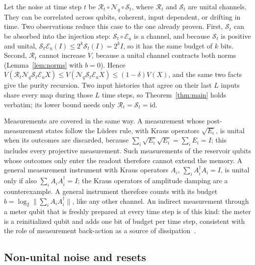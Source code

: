 \documentclass[aps,prl,twocolumn,superscriptaddress,floatfix]{revtex4-2}
\theoremstyle{plain}
\newcommand{\Norm}[1]{\lVert #1\rVert}
\newcommand{\cE}{\mathcal E}
\newcommand{\Nq}{\mathcal N_q}
\begin{document}
Let the noise at time step $t$ be $\mathcal R_t\circ\Nq\circ\mathcal S_t$, where $\mathcal R_t$ and $\mathcal S_t$ are unital channels. They can be correlated across qubits, coherent, input dependent, or drifting in time. Two observations reduce this case to the one already proven. First, $\mathcal S_t$ can be absorbed into the injection step: $\mathcal S_t\circ\cE_u$ is a channel, and because $\mathcal S_t$ is positive and unital, $\mathcal S_t\cE_u(I)\le2^k\mathcal S_t(I)=2^kI$, so it has the same budget of $k$ bits. Second, $\mathcal R_t$ cannot increase $V$, because a unital channel contracts both norms (Lemma~\ref{lem:norms} with $b=0$). Hence $V(\mathcal R_t\Nq\mathcal S_t\cE_uX)\le V(\Nq\mathcal S_t\cE_uX)\le(1-\delta)V(X)$, and the same two facts give the purity recursion. Two input histories that agree on their last $L$ inputs share every map during those $L$ time steps, so Theorem~\ref{thm:main} holds verbatim; its lower bound needs only $\mathcal R_t=\mathcal S_t=\mathrm{id}$.

Measurements are covered in the same way. A measurement whose post-measurement states follow the L\"uders rule, with Kraus operators $\sqrt{E_i}$, is unital when its outcomes are discarded, because $\sum_i\sqrt{E_i}\sqrt{E_i}=\sum_iE_i=I$; this includes every projective measurement. Such measurements of the reservoir qubits whose outcomes only enter the readout therefore cannot extend the memory. A general measurement instrument with Kraus operators $A_i$, $\sum_iA_i^\dagger A_i=I$, is unital only if also $\sum_iA_iA_i^\dagger=I$; the Kraus operators of amplitude damping are a counterexample. A general instrument therefore counts with its budget $b=\log_2\Norm{\sum_iA_iA_i^\dagger}$, like any other channel. An indirect measurement through a meter qubit that is freshly prepared at every time step is of this kind: the meter is a reinitialized qubit and adds one bit of budget per time step, consistent with the role of measurement back-action as a source of dissipation~\cite{MorguiSancho2026}.

\subsection{Non-unital noise and resets}
\end{document}
